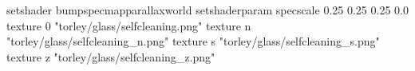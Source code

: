 setshader bumpspecmapparallaxworld
setshaderparam specscale 0.25 0.25 0.25 0.0
texture 0 "torley/glass/selfcleaning.png"
texture n "torley/glass/selfcleaning_n.png"
texture s "torley/glass/selfcleaning_s.png"
texture z "torley/glass/selfcleaning_z.png"

